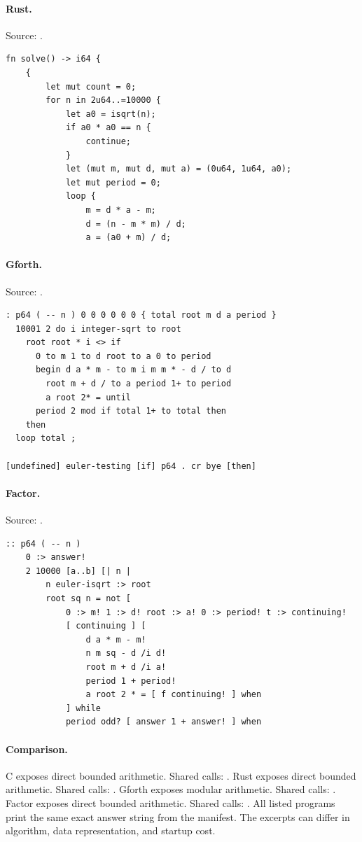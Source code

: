 \paragraph{Rust.} Source: .
\begin{lstlisting}
fn solve() -> i64 {
    {
        let mut count = 0;
        for n in 2u64..=10000 {
            let a0 = isqrt(n);
            if a0 * a0 == n {
                continue;
            }
            let (mut m, mut d, mut a) = (0u64, 1u64, a0);
            let mut period = 0;
            loop {
                m = d * a - m;
                d = (n - m * m) / d;
                a = (a0 + m) / d;
\end{lstlisting}

\paragraph{Gforth.} Source: .
\begin{lstlisting}
: p64 ( -- n ) 0 0 0 0 0 0 { total root m d a period }
  10001 2 do i integer-sqrt to root
    root root * i <> if
      0 to m 1 to d root to a 0 to period
      begin d a * m - to m i m m * - d / to d
        root m + d / to a period 1+ to period
        a root 2* = until
      period 2 mod if total 1+ to total then
    then
  loop total ;

[undefined] euler-testing [if] p64 . cr bye [then]
\end{lstlisting}

\paragraph{Factor.} Source: .
\begin{lstlisting}
:: p64 ( -- n )
    0 :> answer!
    2 10000 [a..b] [| n |
        n euler-isqrt :> root
        root sq n = not [
            0 :> m! 1 :> d! root :> a! 0 :> period! t :> continuing!
            [ continuing ] [
                d a * m - m!
                n m sq - d /i d!
                root m + d /i a!
                period 1 + period!
                a root 2 * = [ f continuing! ] when
            ] while
            period odd? [ answer 1 + answer! ] when
\end{lstlisting}

\paragraph{Comparison.}
C exposes direct bounded arithmetic. Shared calls: \texttt{}. Rust exposes direct bounded arithmetic. Shared calls: \texttt{}. Gforth exposes modular arithmetic. Shared calls: \texttt{}. Factor exposes direct bounded arithmetic. Shared calls: \texttt{}.
All listed programs print the same exact answer string from the manifest. The excerpts can differ in algorithm, data representation, and startup cost.

